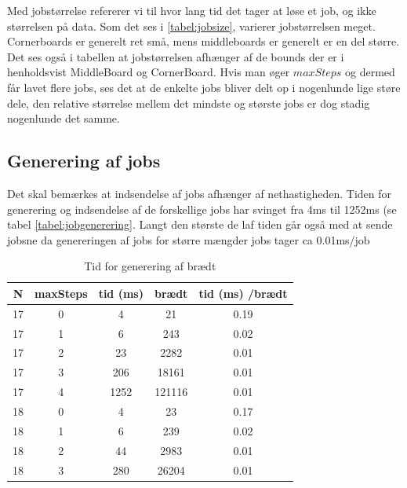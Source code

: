 Med jobstørrelse refererer vi til hvor lang tid det tager at løse et job, og
ikke størrelsen på data. 
Som det ses i \ref{tabel:jobsize}, varierer jobstørrelsen
meget. Cornerboards er generelt ret små, mens middleboards er generelt er en del
større. Det ses også i tabellen at jobstørrelsen afhænger af de bounds der er i
henholdsvist MiddleBoard og CornerBoard. Hvis man øger $maxSteps$ og dermed får
lavet flere jobs, ses det at de enkelte jobs bliver delt op i nogenlunde lige
støre dele, den relative størrelse mellem det mindste og største jobs er dog
stadig nogenlunde det samme. 

\subsection{Generering af jobs}

Det skal bemærkes at indsendelse af jobs afhænger af nethastigheden. Tiden for
generering og indsendelse af de forskellige jobs har svinget fra 4ms til 1252ms (se tabel
\ref{tabel:jobgenerering}. Langt den største de laf tiden går også med at sende
jobsne da genereringen af jobs for større mængder jobs tager ca 0.01ms/job

\begin{table}
\begin{center}
\begin{tabular}{|c|c|c|c|c|}
\hline N & maxSteps & tid (ms) & brædt & tid (ms) /brædt \\
\hline 17 & 0 & 4 & 21 & 0.19 \\
\hline 17 & 1 & 6 & 243 & 0.02 \\
\hline 17 & 2 & 23 & 2282 & 0.01 \\
\hline 17 & 3 & 206 & 18161 & 0.01 \\
\hline 17 & 4 & 1252 & 121116 & 0.01 \\
\hline 18 & 0 & 4 & 23 & 0.17 \\
\hline 18 & 1 & 6 & 239 & 0.02 \\
\hline 18 & 2 & 44 & 2983 & 0.01 \\
\hline 18 & 3 & 280 & 26204 & 0.01 \\
\hline
\end{tabular}
\caption{Tid for generering af brædt}
\label{table:boardgenering}
\end{center}
\end{table}

